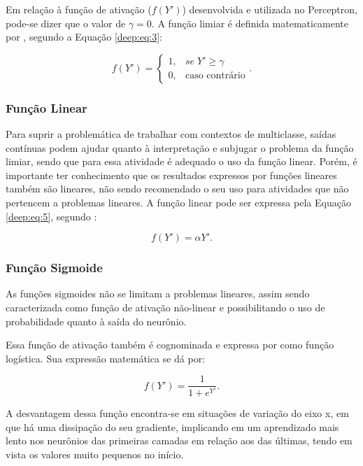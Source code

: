 Em relação à função de ativação ($f(Y')$) desenvolvida e utilizada no Perceptron, pode-se dizer que o valor de $\gamma = 0$. A função limiar é definida matematicamente por \cite{mcculloch1943logical}, segundo a Equação \ref{deep:eq:3}:

\begin{equation}
    \label{deep:eq:3}
    f(Y') = \begin{cases}
     1,& se \; Y' \geq \gamma \\ 
     0,& \text{caso contrário}
    \end{cases}.
\end{equation}


\subsubsection{Função Linear}
\label{deep:linear}
Para suprir a problemática de trabalhar com contextos de multiclasse, saídas contínuas podem ajudar quanto à interpretação e subjugar o problema da função limiar, sendo que para essa atividade é adequado o uso da função linear. Porém, é importante ter conhecimento que os resultados expressos por funções lineares também são lineares, não sendo recomendado o seu uso para atividades que não pertencem a problemas lineares. A função linear pode ser expressa pela Equação \ref{deep:eq:5}, segundo \cite{Rosenblatt1958}:

\begin{equation}
    \label{deep:eq:5}
    f(Y') = \alpha Y'.
\end{equation}


\subsubsection{Função Sigmoide}
\label{deep:sigmoide}
As funções sigmoides não se limitam a problemas lineares, assim sendo caracterizada como função de ativação não-linear e possibilitando o uso de probabilidade quanto à saída do neurônio.

Essa função de ativação também é cognominada e expressa por \cite{glorot2011deep} como função logística. Sua expressão matemática se dá por:

\begin{equation}
    \label{deep:eq:6}
    f(Y') = \frac{1}{1 + e^{Y'}}.
\end{equation}

A desvantagem dessa função encontra-se em situações de variação do eixo x, em que há uma  dissipação do seu gradiente, implicando em um aprendizado mais lento nos neurônios das primeiras camadas em relação aos das últimas, tendo em vista os valores muito pequenos no início.

